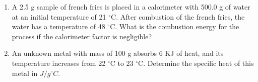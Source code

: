 \documentclass[main.tex]{subfiles}
\begin{document}
\pagestyle{style4}
\setlength{\parskip}{0.5em}
\begin{fullwidth}
\begin{multicols*}{2}\begin{enumerate}  \setlength\itemsep{0.2em}












\item  A 2.5 g sample of french fries is placed in a calorimeter with 500.0 g of water at an initial temperature of 21 $^{\circ}$C.  After combustion of the french fries, the water has a temperature of 48 $^{\circ}$C.  What is the combustion energy for the process if the calorimeter factor is negligible?
\begin{enumerate}[label=(\alph*)]\vspace{-0.5cm}
\end{enumerate}\vspace{-0.5cm}

\item  An unknown metal with mass of 100 g absorbs 6 KJ of heat, and its temperature increases from 22 $^{\circ}$C to 23 $^{\circ}$C. Determine the specific heat of this metal in $J/g ^{\circ}C$.
\begin{enumerate}[label=(\alph*)]\vspace{-0.5cm}
\end{enumerate}\vspace{-0.5cm}


\end{enumerate}
\end{multicols*}
\end{fullwidth}
\end{document}
